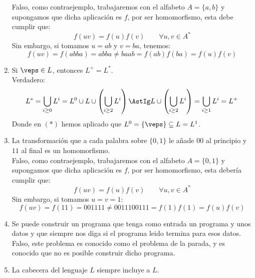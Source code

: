 \begin{enumerate}
        Falso, como contraejemplo, trabajaremos con el alfabeto $A=\{a,b\}$ y supongamos que dicha aplicación es $f$, por ser homomorfismo, esta debe cumplir que:
        \begin{equation*}
            f(uv) = f(u)f(v) \qquad \forall u,v\in A^\ast
        \end{equation*}
        Sin embargo, si tomamos $u=ab$ y $v=ba$, tenemos:
        \begin{equation*}
            f(uv) = f(abba) = abba \neq baab = f(ab)f(ba) = f(u)f(v)
        \end{equation*}
    \item \label{item:preg8}
    Si $\veps \in L$, entonces $L^+ = L^\ast$.\\

        Verdadero:
        \begin{equation*}
            L^\ast = \bigcup_{i\geq 0} L^i = L^0 \cup L \cup \left(\bigcup_{i\geq 2} L^i\right) \AstIg  L \cup \left(\bigcup_{i\geq 2} L^i\right) = \bigcup_{i\geq 1}L^i = L^+
        \end{equation*}
        Donde en $(\ast)$ hemos aplicado que $L^0 = \{\veps\} \subseteq L = L^1$.
    \item La transformación que a cada palabra sobre $\{0,1\}$ le añade $00$ al principio y $11$ al final es un homomorfismo.\\

        Falso, como contraejemplo, trabajaremos con el alfabeto $A=\{0,1\}$ y supongamos que dicha aplicación es $f$, por ser homomorfismo, esta debería cumplir que:
        \begin{equation*}
            f(uv) = f(u)f(v) \qquad \forall u,v\in A^\ast
        \end{equation*}
        Sin embargo, si tomamos $u = v = 1$:
        \begin{equation*}
            f(uv) = f(11) = 001111 \neq 0011100111 = f(1)f(1) = f(u)f(v)
        \end{equation*}
    \item Se puede construir un programa que tenga como entrada un programa y unos datos y que siempre nos diga si el programa leido termina para esos datos.\\

        Falso, este problema es conocido como el problema de la parada, y es conocido que no es posible construir dicho programa.
    \item La cabecera del lenguaje $L$ siempre incluye a $L$.\\


\end{enumerate}
